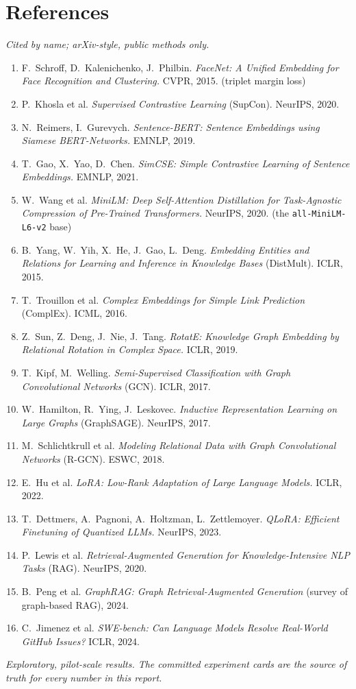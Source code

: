 \documentclass[11pt]{article}
\newcommand{\code}[1]{\texttt{#1}}
\begin{document}
\section{References}
\label{sec:refs}

\emph{Cited by name; arXiv-style, public methods only.}

\begin{enumerate}[leftmargin=1.6em,nosep]
\item F.\ Schroff, D.\ Kalenichenko, J.\ Philbin. \emph{FaceNet: A Unified Embedding
for Face Recognition and Clustering.} CVPR, 2015. (triplet margin loss)
\item P.\ Khosla et al. \emph{Supervised Contrastive Learning} (SupCon). NeurIPS,
2020.
\item N.\ Reimers, I.\ Gurevych. \emph{Sentence-BERT: Sentence Embeddings using
Siamese BERT-Networks.} EMNLP, 2019.
\item T.\ Gao, X.\ Yao, D.\ Chen. \emph{SimCSE: Simple Contrastive Learning of
Sentence Embeddings.} EMNLP, 2021.
\item W.\ Wang et al. \emph{MiniLM: Deep Self-Attention Distillation for
Task-Agnostic Compression of Pre-Trained Transformers.} NeurIPS, 2020. (the
\code{all-MiniLM-L6-v2} base)
\item B.\ Yang, W.\ Yih, X.\ He, J.\ Gao, L.\ Deng. \emph{Embedding Entities and
Relations for Learning and Inference in Knowledge Bases} (DistMult). ICLR, 2015.
\item T.\ Trouillon et al. \emph{Complex Embeddings for Simple Link Prediction}
(ComplEx). ICML, 2016.
\item Z.\ Sun, Z.\ Deng, J.\ Nie, J.\ Tang. \emph{RotatE: Knowledge Graph Embedding
by Relational Rotation in Complex Space.} ICLR, 2019.
\item T.\ Kipf, M.\ Welling. \emph{Semi-Supervised Classification with Graph
Convolutional Networks} (GCN). ICLR, 2017.
\item W.\ Hamilton, R.\ Ying, J.\ Leskovec. \emph{Inductive Representation Learning
on Large Graphs} (GraphSAGE). NeurIPS, 2017.
\item M.\ Schlichtkrull et al. \emph{Modeling Relational Data with Graph
Convolutional Networks} (R-GCN). ESWC, 2018.
\item E.\ Hu et al. \emph{LoRA: Low-Rank Adaptation of Large Language Models.} ICLR,
2022.
\item T.\ Dettmers, A.\ Pagnoni, A.\ Holtzman, L.\ Zettlemoyer. \emph{QLoRA:
Efficient Finetuning of Quantized LLMs.} NeurIPS, 2023.
\item P.\ Lewis et al. \emph{Retrieval-Augmented Generation for Knowledge-Intensive
NLP Tasks} (RAG). NeurIPS, 2020.
\item B.\ Peng et al. \emph{GraphRAG: Graph Retrieval-Augmented Generation} (survey
of graph-based RAG), 2024.
\item C.\ Jimenez et al. \emph{SWE-bench: Can Language Models Resolve Real-World
GitHub Issues?} ICLR, 2024.
\end{enumerate}

\vfill
\begin{center}
\small\emph{Exploratory, pilot-scale results. The committed experiment cards are the
source of truth for every number in this report.}
\end{center}
\end{document}
